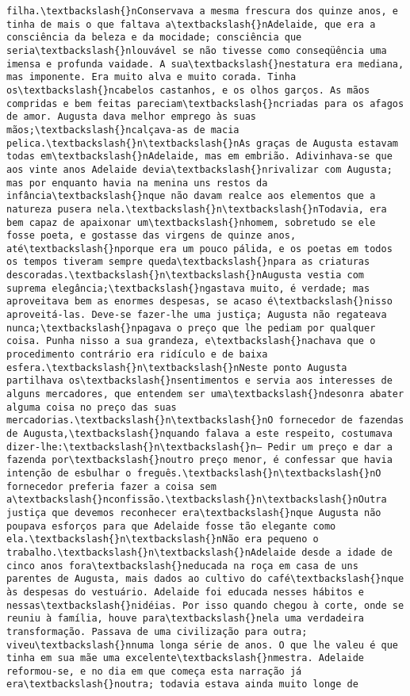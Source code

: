 \documentclass[11pt]{article}
\begin{document}
\begin{Verbatim}[commandchars=\\\{\}]
filha.\textbackslash{}nConservava a mesma frescura dos quinze anos, e tinha de mais o que faltava a\textbackslash{}nAdelaide, que era a consciência da beleza e da mocidade; consciência que seria\textbackslash{}nlouvável se não tivesse como conseqüência uma imensa e profunda vaidade. A sua\textbackslash{}nestatura era mediana, mas imponente. Era muito alva e muito corada. Tinha os\textbackslash{}ncabelos castanhos, e os olhos garços. As mãos compridas e bem feitas pareciam\textbackslash{}ncriadas para os afagos de amor. Augusta dava melhor emprego às suas mãos;\textbackslash{}ncalçava-as de macia pelica.\textbackslash{}n\textbackslash{}nAs graças de Augusta estavam todas em\textbackslash{}nAdelaide, mas em embrião. Adivinhava-se que aos vinte anos Adelaide devia\textbackslash{}nrivalizar com Augusta; mas por enquanto havia na menina uns restos da infância\textbackslash{}nque não davam realce aos elementos que a natureza pusera nela.\textbackslash{}n\textbackslash{}nTodavia, era bem capaz de apaixonar um\textbackslash{}nhomem, sobretudo se ele fosse poeta, e gostasse das virgens de quinze anos, até\textbackslash{}nporque era um pouco pálida, e os poetas em todos os tempos tiveram sempre queda\textbackslash{}npara as criaturas descoradas.\textbackslash{}n\textbackslash{}nAugusta vestia com suprema elegância;\textbackslash{}ngastava muito, é verdade; mas aproveitava bem as enormes despesas, se acaso é\textbackslash{}nisso aproveitá-las. Deve-se fazer-lhe uma justiça; Augusta não regateava nunca;\textbackslash{}npagava o preço que lhe pediam por qualquer coisa. Punha nisso a sua grandeza, e\textbackslash{}nachava que o procedimento contrário era ridículo e de baixa esfera.\textbackslash{}n\textbackslash{}nNeste ponto Augusta partilhava os\textbackslash{}nsentimentos e servia aos interesses de alguns mercadores, que entendem ser uma\textbackslash{}ndesonra abater alguma coisa no preço das suas mercadorias.\textbackslash{}n\textbackslash{}nO fornecedor de fazendas de Augusta,\textbackslash{}nquando falava a este respeito, costumava dizer-lhe:\textbackslash{}n\textbackslash{}n— Pedir um preço e dar a fazenda por\textbackslash{}noutro preço menor, é confessar que havia intenção de esbulhar o freguês.\textbackslash{}n\textbackslash{}nO fornecedor preferia fazer a coisa sem a\textbackslash{}nconfissão.\textbackslash{}n\textbackslash{}nOutra justiça que devemos reconhecer era\textbackslash{}nque Augusta não poupava esforços para que Adelaide fosse tão elegante como ela.\textbackslash{}n\textbackslash{}nNão era pequeno o trabalho.\textbackslash{}n\textbackslash{}nAdelaide desde a idade de cinco anos fora\textbackslash{}neducada na roça em casa de uns parentes de Augusta, mais dados ao cultivo do café\textbackslash{}nque às despesas do vestuário. Adelaide foi educada nesses hábitos e nessas\textbackslash{}nidéias. Por isso quando chegou à corte, onde se reuniu à família, houve para\textbackslash{}nela uma verdadeira transformação. Passava de uma civilização para outra; viveu\textbackslash{}nnuma longa série de anos. O que lhe valeu é que tinha em sua mãe uma excelente\textbackslash{}nmestra. Adelaide reformou-se, e no dia em que começa esta narração já era\textbackslash{}noutra; todavia estava ainda muito longe de 
\end{Verbatim}
\end{document}
